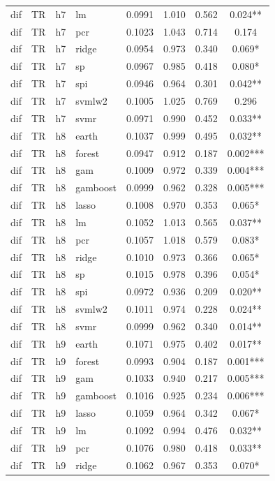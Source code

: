 \begin{ThreePartTable}
\begin{longtable}[t]{llclcccc}
dif & TR & h7 & lm & 0.0991 & 1.010 & 0.562 & 0.024**\\
dif & TR & h7 & pcr & 0.1023 & 1.043 & 0.714 & 0.174\\
dif & TR & h7 & ridge & 0.0954 & 0.973 & 0.340 & 0.069*\\
dif & TR & h7 & sp & 0.0967 & 0.985 & 0.418 & 0.080*\\
dif & TR & h7 & spi & 0.0946 & 0.964 & 0.301 & 0.042**\\
dif & TR & h7 & svmlw2 & 0.1005 & 1.025 & 0.769 & 0.296\\
dif & TR & h7 & svmr & 0.0971 & 0.990 & 0.452 & 0.033**\\
\addlinespace
dif & TR & h8 & earth & 0.1037 & 0.999 & 0.495 & 0.032**\\
dif & TR & h8 & forest & 0.0947 & 0.912 & 0.187 & 0.002***\\
dif & TR & h8 & gam & 0.1009 & 0.972 & 0.339 & 0.004***\\
dif & TR & h8 & gamboost & 0.0999 & 0.962 & 0.328 & 0.005***\\
dif & TR & h8 & lasso & 0.1008 & 0.970 & 0.353 & 0.065*\\
dif & TR & h8 & lm & 0.1052 & 1.013 & 0.565 & 0.037**\\
dif & TR & h8 & pcr & 0.1057 & 1.018 & 0.579 & 0.083*\\
dif & TR & h8 & ridge & 0.1010 & 0.973 & 0.366 & 0.065*\\
dif & TR & h8 & sp & 0.1015 & 0.978 & 0.396 & 0.054*\\
dif & TR & h8 & spi & 0.0972 & 0.936 & 0.209 & 0.020**\\
dif & TR & h8 & svmlw2 & 0.1011 & 0.974 & 0.228 & 0.024**\\
dif & TR & h8 & svmr & 0.0999 & 0.962 & 0.340 & 0.014**\\
\addlinespace
dif & TR & h9 & earth & 0.1071 & 0.975 & 0.402 & 0.017**\\
dif & TR & h9 & forest & 0.0993 & 0.904 & 0.187 & 0.001***\\
dif & TR & h9 & gam & 0.1033 & 0.940 & 0.217 & 0.005***\\
dif & TR & h9 & gamboost & 0.1016 & 0.925 & 0.234 & 0.006***\\
dif & TR & h9 & lasso & 0.1059 & 0.964 & 0.342 & 0.067*\\
dif & TR & h9 & lm & 0.1092 & 0.994 & 0.476 & 0.032**\\
dif & TR & h9 & pcr & 0.1076 & 0.980 & 0.418 & 0.033**\\
dif & TR & h9 & ridge & 0.1062 & 0.967 & 0.353 & 0.070*\\

\end{longtable}
\end{ThreePartTable}
